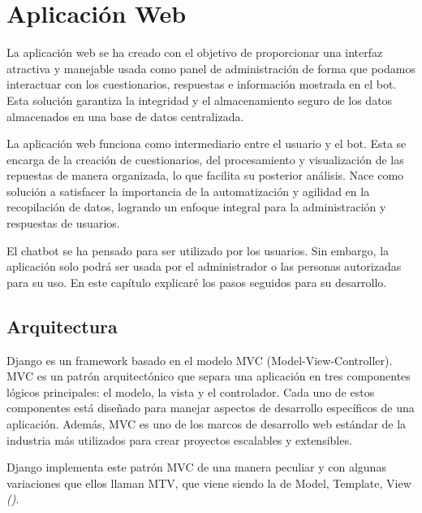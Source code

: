 \chapter{Aplicación Web}

La aplicación web se ha creado con el objetivo de proporcionar una interfaz atractiva y manejable usada como panel de administración de forma que podamos interactuar con los cuestionarios, respuestas e información mostrada en el bot. Esta solución garantiza la integridad y el almacenamiento seguro de los datos almacenados en una base de datos centralizada. 

La aplicación web funciona como intermediario entre el usuario y el bot. Esta se encarga de la creación de cuestionarios, del procesamiento y visualización de las repuestas de manera organizada, lo que facilita su posterior análisis. Nace como solución a satisfacer la importancia de la automatización y agilidad en la recopilación de datos, logrando un enfoque integral para la administración y respuestas de usuarios.

El chatbot se ha pensado para ser utilizado por los usuarios. Sin embargo, la aplicación solo podrá ser usada por el administrador o las personas autorizadas para su uso. En este capítulo explicaré los pasos seguidos para su desarrollo.


\section{Arquitectura} 


Django es un framework basado en el modelo  MVC (Model-View-Controller). MVC es un patrón arquitectónico que separa una aplicación en tres componentes lógicos principales: el modelo, la vista y el controlador. Cada uno de estos componentes está diseñado para manejar aspectos de desarrollo específicos de una aplicación. Además, MVC es uno de los marcos de desarrollo web estándar de la industria más utilizados para crear proyectos escalables y extensibles.

Django implementa este patrón MVC de una manera peculiar y con algunas variaciones que ellos llaman MTV, que viene siendo la de Model, Template, View \textit{(\cite{djangomvt})}.

